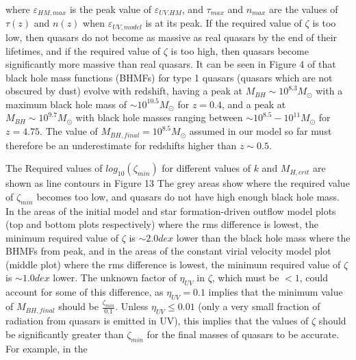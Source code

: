 \documentclass[12pt, twocolumn]{report}%
\begin{document}
\noindent where $\varepsilon_{HM,max}$ is the peak value of $\varepsilon_{UV.HM}$, and $\tau_{max}$ and $n_{max}$ are the values of $\tau(z)$ and $n(z)$ when $\varepsilon_{UV,model}$ is at its peak. If the required value of $\zeta$ is too low, then quasars do not become as massive as real quasars by the end of their lifetimes, and if the required value of $\zeta$ is too high, then quasars become significantly more massive than real quasars. It can be seen in Figure 4 of \cite{BH_mass_fns} that black hole mass functions (BHMFs) for type 1 quasars (quasars which are not obscured by dust) evolve with redshift, having a peak at $M_{BH}\sim10^{8.3}M_\odot$ with a maximum black hole mass of $\sim10^{10.5}M_\odot$ for $z=0.4$, and a peak at $M_{BH}\sim10^{9.7}M_\odot$ with black hole masses ranging between $\sim10^{8.5}-10^{11}M_\odot$ for $z=4.75$. The value of $M_{BH,final}=10^{8.5}M_\odot$ assumed in our model so far must therefore be an underestimate for redshifts higher than $z\sim0.5$.\par

The Required values of $log_{10}(\zeta_{min})$ for different values of $k$ and $M_{H,crit}$ are shown as line contours in Figure 13 The grey areas show where the required value of $\zeta_{min}$ becomes too low, and quasars do not have high enough black hole mass. In the areas of the initial model and star formation-driven outflow model plots (top and bottom plots respectively) where the rms difference is lowest, the minimum required value of $\zeta$ is $\sim2.0dex$ lower than the black hole mass where the BHMFs from \citeauthor{BH_mass_fns} peak, and in the areas of the constant virial velocity model plot (middle plot) where the rms difference is lowest, the minimum required value of $\zeta$ is $\sim1.0dex$ lower. The unknown factor of $\eta_{UV}$ in $\zeta$, which must be $<1$, could account for some of this difference, as $\eta_{UV}=0.1$ implies that the minimum value of $M_{BH,final}$ should be $\frac{\zeta_{min}}{0.1}$. Unless $\eta_{UV}\leq0.01$ (only a very small fraction of radiation from quasars is emitted in UV), this implies that the values of $\zeta$ should be significantly greater than $\zeta_{min}$ for the final masses of quasars to be accurate. For example, in the

\onecolumngrid
\end{document}
